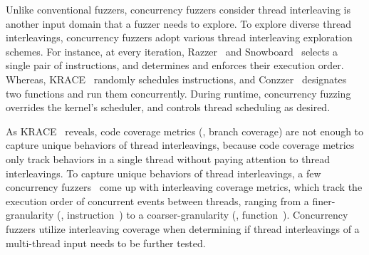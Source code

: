 





%
Unlike conventional fuzzers, concurrency fuzzers consider thread
interleaving is another input domain that a fuzzer needs to explore.
%
To explore diverse thread interleavings, concurrency fuzzers adopt
various thread interleaving exploration schemes.
%
For instance, at every iteration, Razzer~\cite{razzer} and
Snowboard~\cite{snowboard} selects a single pair of instructions, and
determines and enforces their execution order.
%
Whereas, KRACE~\cite{krace} randomly schedules instructions, and
Conzzer~\cite{conzzer} designates two functions and run them
concurrently.
%
During runtime, concurrency fuzzing overrides the kernel's scheduler,
and controls thread scheduling as desired.


%
As KRACE~\cite{krace} reveals, code coverage metrics (\eg, branch
coverage) are not enough to capture unique behaviors of thread
interleavings, because code coverage metrics only track behaviors in a
single thread without paying attention to thread interleavings.
%
To capture unique behaviors of thread interleavings, a few concurrency
fuzzers~\cite{conzzer, krace} come up with interleaving coverage
metrics, which track the execution order of concurrent events between
threads, ranging from a finer-granularity (\eg,
instruction~\cite{krace}) to a coarser-granularity (\eg,
function~\cite{conzzer}).
%
Concurrency fuzzers utilize interleaving coverage when determining if
thread interleavings of a multi-thread input needs to be further
tested.

